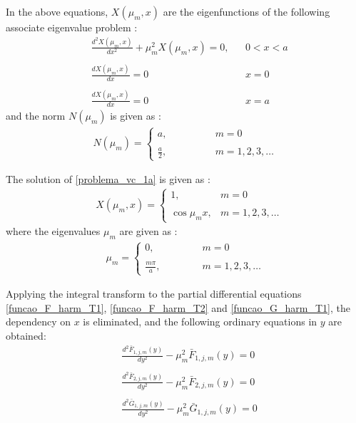 \documentclass[12pt]{CHT-20}
\begin{document}
In the above equations, $X(\mu_m, x)$ are the eigenfunctions of the following associate eigenvalue problem \citep{livro_integral_transforms_cotta}:
\begin{subequations}
	\begin{alignat}{2}
	& \frac{d^2 X(\mu_m, x)}{d x^2} + \mu_m^2 X(\mu_m, x) = 0, && 0 < x < a \label{problema_vc_1a} \\ \nonumber \\
	& \frac{d X(\mu_m, x)}{d x} = 0 && x = 0 \label{problema_vc_1b} \\ \nonumber \\
	& \frac{d X(\mu_m, x)}{d x} = 0 && x = a \label{problema_vc_1c}
	\end{alignat}
\end{subequations}
and the norm $N(\mu_m)$ is given as \citep{livro_integral_transforms_cotta}:
\begin{align}
N(\mu_m) = \left\lbrace
\begin{array}{ll}
a, \quad\quad\quad\quad & m = 0 \\ \\
\displaystyle\frac{a}{2}, & m = 1,2,3,\ldots
\end{array}
\right. \label{valor_integral_norm}
\end{align}

The solution of \eqref{problema_vc_1a} is given as \citep{livro_integral_transforms_cotta}:
\begin{align}
& X(\mu_m, x) = \left\lbrace
\begin{array}{ll}
1, & m = 0 \\ \\
\cos \mu_m x, & m = 1,2,3,\ldots
\end{array}
\right . \label{definicao_das_autofuncoes}
\end{align}
where the eigenvalues $\mu_m$ are given as \citep{livro_integral_transforms_cotta}:
\begin{align}
\mu_m = \left\lbrace
\begin{array}{ll}
0, \quad\quad\quad\quad & m = 0 \\ \\
\displaystyle\frac{m\pi}{a}, & m = 1,2,3,\ldots
\end{array}
\right.
\end{align}

Applying the integral transform to the partial differential equations \eqref{funcao_F_harm_T1}, \eqref{funcao_F_harm_T2} and \eqref{funcao_G_harm_T1}, the dependency on $x$ is eliminated, and the following ordinary equations in $y$ are obtained:
\begin{align}
& \frac{d^2 \bar{F}_{1,j,m}(y)}{d y^2}
-
\mu_m^2 \bar{F}_{1,j,m}(y) = 0 \label{eq_dif_ord_F1} \\ \nonumber \\
& \frac{d^2 \bar{F}_{2,j,m}(y)}{d y^2}
-
\mu_m^2 \bar{F}_{2,j,m}(y) = 0 \label{eq_dif_ord_F2} \\ \nonumber \\
& \frac{d^2 \bar{G}_{1,j,m}(y)}{d y^2}
-
\mu_m^2 \bar{G}_{1,j,m}(y) = 0 \label{eq_dif_ord_G1}
\end{align}
\end{document}
